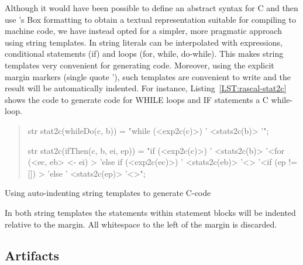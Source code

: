 Although it would have been possible to define an abstract
syntax for C and then use \Rascal's Box formatting to obtain a textual
representation suitable for compiling to machine code, we have instead
opted for a simpler, more pragmatic approach using string
templates. In \Rascal string literals can be interpolated with
expressions, conditional statements (if) and loops (for, while,
do-while). This makes string templates very convenient for generating
code. Moreover, using the explicit margin markers (single quote '),
such templates are convenient to write and the result will be
automatically indented. For instance, Listing~\ref{LST:rascal-stat2c} shows the code to generate
code for WHILE loops and IF statements a C while-loop.
\begin{listing}
\begin{quote}
\begin{rascal}
str stat2c(whileDo(c, b)) = "while (<exp2c(c)>) {
                            '  <stats2c(b)>
                            '}";

str stat2c(ifThen(c, b, ei, ep)) = 
                            "if (<exp2c(c)>) {
                            '  <stats2c(b)>
                            '}<for (<ec, eb> <- ei) {>
                            'else if (<exp2c(ec)>) {
                            '  <stats2c(eb)>
                            '}<}>
                            '<if (ep != []) {>
                            'else {
                            '  <stats2c(ep)>
                            '}<}>";
\end{rascal}
\end{quote}
\caption{Using auto-indenting string templates to generate C-code}
\label{LST:rascal-stat2c}
\end{listing}
In both string templates the statements within statement blocks will
be indented relative to the margin. All whitespace to the left of the
margin is discarded.


\subsection{Artifacts}


